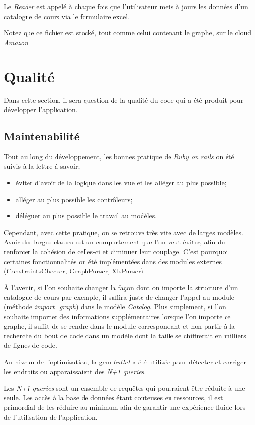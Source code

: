 Le \textit{Reader} est appelé à chaque fois que l'utilisateur mets à jours  les données d'un catalogue de cours via le formulaire excel. 


Notez que ce fichier est stocké, tout comme celui contenant le graphe, sur le cloud \textit{Amazon}
\section{Qualité}
Dans cette section, il sera question de la qualité du code qui a été produit pour développer l'application. 

\subsection{Maintenabilité}

Tout au long du développement, les bonnes pratique de \textit{Ruby on rails} on été suivis à la lettre à savoir;
\begin{itemize}
\item éviter d'avoir de la logique dans les vue et les alléger au plus possible;
\item alléger au plus possible les contrôleurs;
\item déléguer au plus possible le travail au modèles.
\end{itemize}

Cependant, avec cette pratique, on se retrouve très vite avec de larges modèles. Avoir des larges classes est un comportement que l'on veut éviter, afin de renforcer la cohésion de celles-ci et diminuer leur couplage. C'est pourquoi certaines fonctionnalités on été implémentées dans des modules externes (ConstraintsChecker, GraphParser, XlsParser).

À l'avenir, si l'on souhaite changer la façon dont on importe la structure d'un catalogue de cours par exemple, il suffira juste de changer l'appel au module (méthode \textit{import\_graph}) dans le modèle \textit{Catalog}. Plus simplement, si l'on souhaite importer des informations supplémentaires lorsque l'on importe ce graphe, il suffit de se rendre dans le module correspondant et non partir à la recherche du bout de code dans un modèle dont la taille se chiffrerait en milliers de lignes de code.

Au niveau de l'optimisation, la gem \textit{bullet} a été utilisée pour détecter et corriger les endroits ou apparaissaient des \textit{N+1 queries}. 

Les \textit{N+1 queries} sont un ensemble de requêtes qui pourraient être réduite à une seule. Les accès à la base de données étant couteuses en ressources, il est primordial de les réduire au minimum afin de garantir une expérience fluide lors de l'utilisation de l'application. 

